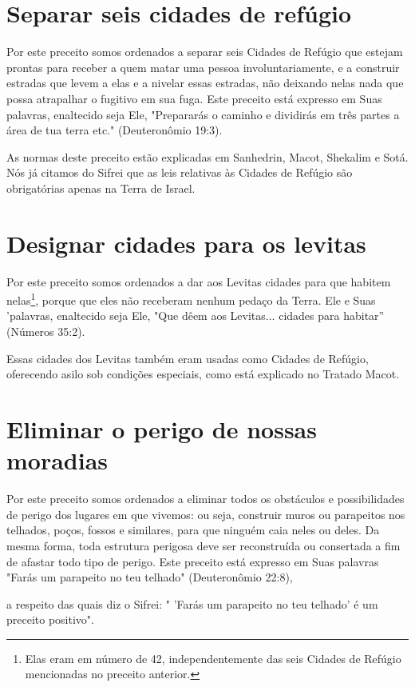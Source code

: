 \section{Separar seis cidades de refúgio}

Por este preceito somos ordenados a separar seis Cidades de Refú­gio que
estejam prontas para receber a quem matar uma pessoa involuntaria­mente,
e a construir estradas que levem a elas e a nivelar essas estradas, não
deixando nelas nada que possa atrapalhar o fugitivo em sua fuga. Este
preceito está expresso em Suas palavras, enaltecido seja Ele,
"Prepararás o caminho e dividirás em três partes a área de tua terra
etc." (Deuteronômio 19:3).

As normas deste preceito estão explicadas em Sanhedrin, Macot, She­kalim
e Sotá. Nós já citamos do Sifrei que as leis relativas às Cidades de
Refúgio são obrigatórias apenas na Terra de Israel.

\section{Designar cidades para os levitas}

Por este preceito somos ordenados a dar aos Levitas cidades para que habitem
nelas\footnote{Elas eram em número de 42, independentemente das seis Cidades de Refúgio mencionadas no preceito anterior.}, porque que eles não receberam nenhum pedaço da
Terra. Ele e Suas 'palavras, enaltecido seja Ele, "Que dêem aos
Levitas... cidades para habitar'' (Números 35:2).

Essas cidades dos Levitas também eram usadas como Cidades de Refúgio, oferecendo asilo
sob condições especiais, como está explicado no Tratado Macot.

\section{Eliminar o perigo de nossas moradias}


Por este preceito somos ordenados a eliminar todos os obstáculos e
possibilidades de perigo dos lugares em que vivemos: ou seja, construir
mu­ros ou parapeitos nos telhados, poços, fossos e similares, para que
ninguém caia neles ou deles. Da mesma forma, toda estrutura perigosa
deve ser reconstruída ou consertada a fim de afastar todo tipo de
perigo. Este preceito está expresso em Suas palavras "Farás um parapeito
no teu telhado" (Deuteronômio 22:8),



a respeito das quais diz o Sifrei: " 'Farás um parapeito no teu telhado'
é um preceito positivo".


